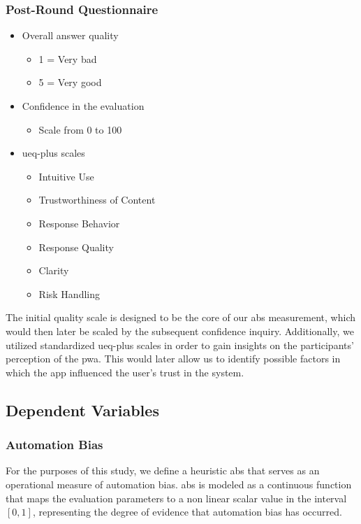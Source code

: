 \documentclass[sigconf,natbib=false]{acmart}
\begin{document}
\subsubsection{Post-Round Questionnaire}
\label{sec:def:PRQ}

\begin{itemize}
\item Overall answer quality
\begin{itemize}
\item 1 = Very bad
\item 5 = Very good
\end{itemize}

\item Confidence in the evaluation
\begin{itemize}
    \item Scale from 0 to 100
\end{itemize}

\item \gls{ueq-plus} scales
\begin{itemize}
    \item Intuitive Use
    \item Trustworthiness of Content
    \item Response Behavior
    \item Response Quality
    \item Clarity
    \item Risk Handling
\end{itemize}

\end{itemize}

The initial quality scale is designed to be the core of our \acrfull{abs} measurement, which would then later be scaled by the subsequent confidence inquiry.
Additionally, we utilized standardized \gls{ueq-plus} scales in order to gain insights on the participants' perception of the \gls{pwa}.
This would later allow us to identify possible factors in which the app influenced the user's trust in the system.

\subsection{Dependent Variables}
\subsubsection{Automation Bias}
\label{sec:automation-bias}

For the purposes of this study, we define a heuristic \acrfull{abs} that serves as an operational measure of automation bias.
\gls{abs} is modeled as a continuous function that maps the evaluation parameters to a non linear scalar value in the interval $[0,1]$, representing the degree of evidence that automation bias has occurred.
\end{document}
